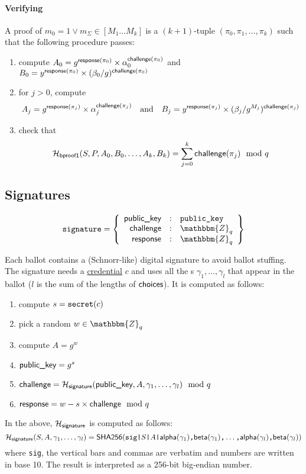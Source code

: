 \documentclass[a4paper]{article}
\newcommand{\Z}{\mathbbm{Z}}
\newcommand{\shatwo}{\textsf{SHA256}}
\begin{document}
\paragraph{Verifying \oproof}
A proof of $m_0=1\lor m_\Sigma\in[M_1\dots M_k]$ is a $(k+1)$-tuple
$(\pi_0,\pi_1,\dotsc,\pi_k)$ such that the following procedure passes:
\begin{enumerate}
\item compute
  $A_0=g^{\textsf{response}(\pi_0)}\times\alpha_0^{\textsf{challenge}(\pi_0)}$
  and
  $B_0=y^{\textsf{response}(\pi_0)}\times(\beta_0/g)^{\textsf{challenge}(\pi_0)}$
\item for $j>0$, compute
  \[A_j=g^{\textsf{response}(\pi_j)}\times\alpha_j^{\textsf{challenge}(\pi_j)}
  \quad\text{and}\quad
  B_j=y^{\textsf{response}(\pi_j)}\times(\beta_j/g^{M_j})^{\textsf{challenge}(\pi_j)}\]
\item check that
  \[\mathcal{H}_{\textsf{bproof1}}(S,P,A_0,B_0,\dots,A_k,B_k)=\sum_{j=0}^k\textsf{challenge}(\pi_j)\mod q\]
\end{enumerate}

\subsection{Signatures}
\label{signatures}

\begin{gather*}
  \signature=\left\{
    \begin{array}{rcl}
      \pklabel&:&\pk\\
      \challenge&:&\Z_q\\
      \response&:&\Z_q
    \end{array}
  \right\}
\end{gather*}

\newcommand{\siglabel}{\textsf{signature}}

Each ballot contains a (Schnorr-like) digital signature to avoid ballot stuffing. The
signature needs a \hyperref[credentials]{credential} $c$ and uses all
the \ciphertext{}s $\gamma_1,\dots,\gamma_l$ that appear in the ballot
($l$ is the sum of the lengths of $\textsf{choices}$). It is computed as
follows:
\begin{enumerate}
\item compute $s=\texttt{secret}(c)$
\item pick a random $w\in\Z_q$
\item compute $A=g^w$
\item $\textsf{public\_key}=g^s$
\item $\challenge=\Hash_\siglabel(\pklabel,A,\gamma_1,\dots,\gamma_l)\mod q$
\item $\textsf{response}=w-s\times\textsf{challenge}\mod q$
\end{enumerate}
In the above, $\Hash_\siglabel$ is computed as follows:
\[
\Hash_\siglabel(S,A,\gamma_1,\dots,\gamma_l)=\shatwo(\verb=sig|=S\verb=|=A\verb=|=\alphalabel(\gamma_1)\verb=,=\betalabel(\gamma_1)\verb=,=\dots\verb=,=\alphalabel(\gamma_l)\verb=,=\betalabel(\gamma_l))
\]
where \verb=sig=, the vertical bars and commas are verbatim and
numbers are written in base 10. The result is interpreted as a 256-bit
big-endian number.
\end{document}
